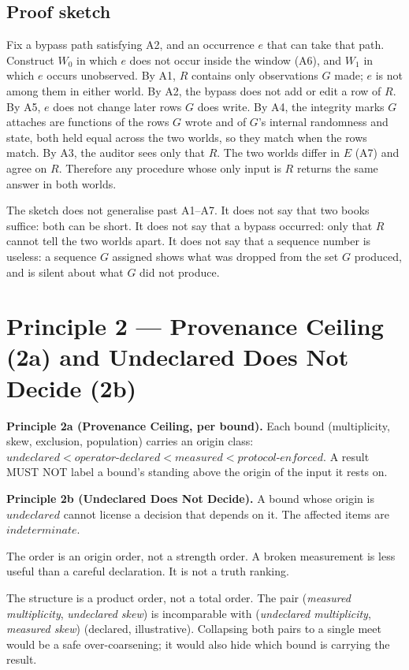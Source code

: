 \documentclass[11pt]{article}
\begin{document}
\subsection{Proof sketch}

Fix a bypass path satisfying A2, and an occurrence $e$ that can take that path. Construct $W_0$ in which $e$ does not occur inside the window (A6), and $W_1$ in which $e$ occurs unobserved. By A1, $R$ contains only observations $G$ made; $e$ is not among them in either world. By A2, the bypass does not add or edit a row of $R$. By A5, $e$ does not change later rows $G$ does write. By A4, the integrity marks $G$ attaches are functions of the rows $G$ wrote and of $G$'s internal randomness and state, both held equal across the two worlds, so they match when the rows match. By A3, the auditor sees only that $R$. The two worlds differ in $E$ (A7) and agree on $R$. Therefore any procedure whose only input is $R$ returns the same answer in both worlds.

The sketch does not generalise past A1--A7. It does not say that two books suffice: both can be short. It does not say that a bypass occurred: only that $R$ cannot tell the two worlds apart. It does not say that a sequence number is useless: a sequence $G$ assigned shows what was dropped from the set $G$ produced, and is silent about what $G$ did not produce.

\section{Principle 2 --- Provenance Ceiling (2a) and Undeclared Does Not Decide (2b)}

\textbf{Principle 2a (Provenance Ceiling, per bound).}
Each bound (multiplicity, skew, exclusion, population) carries an origin class: $\mathit{undeclared} < \mathit{operator\text{-}declared} < \mathit{measured} < \mathit{protocol\text{-}enforced}$. A result MUST NOT label a bound's standing above the origin of the input it rests on.

\textbf{Principle 2b (Undeclared Does Not Decide).}
A bound whose origin is $\mathit{undeclared}$ cannot license a decision that depends on it. The affected items are $\mathit{indeterminate}$.

The order is an origin order, not a strength order. A broken measurement is less useful than a careful declaration. It is not a truth ranking.

The structure is a product order, not a total order. The pair (\textit{measured multiplicity}, \textit{undeclared skew}) is incomparable with (\textit{undeclared multiplicity}, \textit{measured skew}) (declared, illustrative). Collapsing both pairs to a single meet would be a safe over-coarsening; it would also hide which bound is carrying the result.
\end{document}
